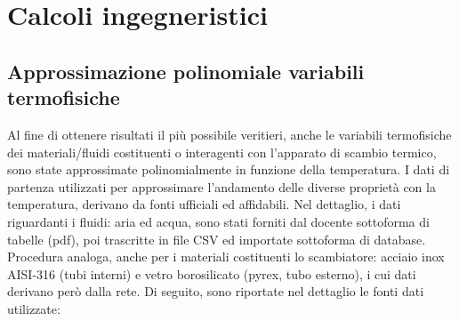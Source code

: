 \documentclass[a4paper,10pt]{article}                                                                                       %
\begin{document}
\section{Calcoli ingegneristici}                                                                                            %
\label{sec:engineering_calcs}                                                                                               %
\subsection{Approssimazione polinomiale variabili termofisiche}                                                             %
\label{subsec:thermovars_polyapprox}                                                                                        %
  Al fine di ottenere risultati il più possibile veritieri, anche le variabili termofisiche dei materiali/fluidi
  costituenti o interagenti con l'apparato di scambio termico, sono state approssimate polinomialmente in funzione della
  temperatura. I dati di partenza utilizzati per approssimare l'andamento delle diverse proprietà con la temperatura,
  derivano da fonti ufficiali ed affidabili. Nel dettaglio, i dati riguardanti i fluidi: aria ed acqua, sono stati forniti
  dal docente sottoforma di tabelle (pdf), poi trascritte in file CSV ed importate sottoforma di database. Procedura
  analoga, anche per i materiali costituenti lo scambiatore: acciaio inox AISI-316 (tubi interni) e vetro borosilicato
  (pyrex, tubo esterno), i cui dati derivano però dalla rete. Di seguito, sono riportate nel dettaglio le fonti dati
  utilizzate:
\end{document}
